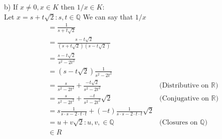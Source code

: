 \documentclass[boxes, qed]{homework}
\begin{document}
\begin{solution}
  b) If $x \ne 0, x\in{K}$ then $1/x\in{K}$:\\

  Let $x=s+t\sqrt{2}:s,t\in{\mathbb{Q}}$
  We can say that $1/x$
  \begin{align*}
    &= \frac{1}{s+t\sqrt{2}}\\
    &= \frac{s-t\sqrt{2}}{(s+t\sqrt{2})(s-t\sqrt{2})}\\
    &= \frac{s-t\sqrt{2}}{s^2-2t^2}\\
    &= (s-t\sqrt{2})\frac{1}{s^2-2t^2}\\
    &= \frac{s}{s^2-2t^2} + \frac{-t\sqrt{2}}{s^2-2t^2}
    & \text{(Distributive on $\mathbb{R}$)}\\
    &= \frac{s}{s^2-2t^2} + \frac{-t}{s^2-2t^2}\sqrt{2}
    & \text{(Conjugative on $\mathbb{R}$)}\\
    &= s\frac{1}{s\cdot{s}-2 \cdot t \cdot t} 
      + (-t)\frac{1}{s\cdot s-2 \cdot t \cdot t}\sqrt{2}\\
    &= u + v\sqrt{2}: u,v,\in\mathbb{Q}
      & \text{(Closures on $\mathbb{Q}$)}\\
    & \in R
  \end{align*}
\end{solution}
\end{document}
